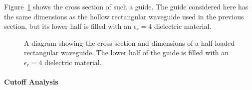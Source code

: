 Figure~\ref{lezar:fig:half_filled_rectangular_guide} shows the cross section
of such a guide. The guide considered here has the same dimensions as
the hollow rectangular waveguide used in the previous section, but its
lower half is filled with an $\epsilon_r = 4$ dielectric material.
\begin{figure}
    \centering
    \caption{A diagram showing the cross section and dimensions of a half-loaded rectangular waveguide.  The lower half of the guide is filled with an $\epsilon_r = 4$ dielectric material.}
    \label{lezar:fig:half_filled_rectangular_guide}
\end{figure}

\paragraph{Cutoff Analysis}


